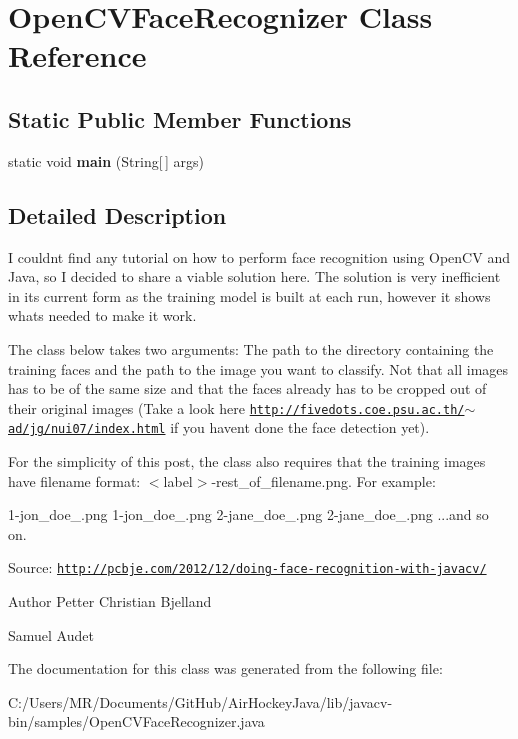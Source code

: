 \hypertarget{class_open_c_v_face_recognizer}{}\section{Open\+C\+V\+Face\+Recognizer Class Reference}
\label{class_open_c_v_face_recognizer}
\subsection*{Static Public Member Functions}
\begin{DoxyCompactItemize}
\item 
\hypertarget{class_open_c_v_face_recognizer_a93208aa3f89ab4d3c7078d1dc51edd3c}{}static void {\bfseries main} (String\mbox{[}$\,$\mbox{]} args)\label{class_open_c_v_face_recognizer_a93208aa3f89ab4d3c7078d1dc51edd3c}

\end{DoxyCompactItemize}


\subsection{Detailed Description}
I couldn\textquotesingle{}t find any tutorial on how to perform face recognition using Open\+C\+V and Java, so I decided to share a viable solution here. The solution is very inefficient in its current form as the training model is built at each run, however it shows what\textquotesingle{}s needed to make it work.

The class below takes two arguments\+: The path to the directory containing the training faces and the path to the image you want to classify. Not that all images has to be of the same size and that the faces already has to be cropped out of their original images (Take a look here \href{http://fivedots.coe.psu.ac.th/~ad/jg/nui07/index.html}{\tt http\+://fivedots.\+coe.\+psu.\+ac.\+th/$\sim$ad/jg/nui07/index.\+html} if you haven\textquotesingle{}t done the face detection yet).

For the simplicity of this post, the class also requires that the training images have filename format\+: $<$label$>$-\/rest\+\_\+of\+\_\+filename.\+png. For example\+:

1-\/jon\+\_\+doe\+\_.\+png 1-\/jon\+\_\+doe\+\_.\+png 2-\/jane\+\_\+doe\+\_.\+png 2-\/jane\+\_\+doe\+\_.\+png ...and so on.

Source\+: \href{http://pcbje.com/2012/12/doing-face-recognition-with-javacv/}{\tt http\+://pcbje.\+com/2012/12/doing-\/face-\/recognition-\/with-\/javacv/}

\begin{DoxyAuthor}{Author}
Petter Christian Bjelland 

Samuel Audet 
\end{DoxyAuthor}


The documentation for this class was generated from the following file\+:\begin{DoxyCompactItemize}
\item 
C\+:/\+Users/\+M\+R/\+Documents/\+Git\+Hub/\+Air\+Hockey\+Java/lib/javacv-\/bin/samples/Open\+C\+V\+Face\+Recognizer.\+java\end{DoxyCompactItemize}
